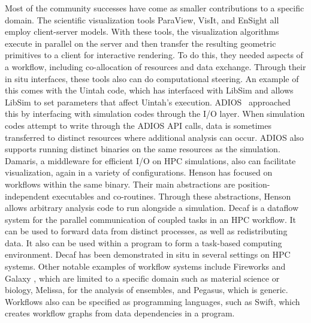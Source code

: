 \begin{refsection}
Most of the community successes have come as smaller contributions to a specific domain.
The scientific visualization tools ParaView, VisIt, and EnSight all employ client-server models.  With these tools, the visualization algorithms execute in parallel on the server and then transfer the resulting geometric primitives to a client for interactive rendering.  To do this, they needed aspects of a workflow, including co-allocation of resources and data exchange.  Through their in situ interfaces, these tools also can do computational steering.  An example of this comes with the Uintah code, which has interfaced with LibSim and allows LibSim to set parameters that affect Uintah’s execution.
ADIOS~\cite{Lofstead08} approached this by interfacing with simulation codes through the I/O layer.  When simulation codes attempt to write through the ADIOS API calls, data is sometimes transferred to distinct resources where additional analysis can occur.  ADIOS also supports running distinct binaries on the same resources as the simulation.  Damaris, a middleware for efficient I/O on HPC simulations, also can facilitate visualization, again in a variety of configurations.
Henson has focused on workflows within the same binary.  Their main abstractions are position-independent executables and co-routines.  Through these abstractions, Henson allows arbitrary analysis code to run alongside a simulation.
Decaf is a dataflow system for the parallel communication of coupled tasks in an HPC workflow.   It can be used to forward data from distinct processes, as well as redistributing data.  It also can be used within a program to form a task-based computing environment.  Decaf has been demonstrated in situ in several settings on HPC systems.  Other notable examples of workflow systems include Fireworks \cite{Jain15} and Galaxy \cite{Afgan11}, which are limited to a specific domain such as material science or biology, Melissa, for the analysis of ensembles, and Pegasus, which is generic.  Workflows also can be specified as programming languages, such as Swift, which creates workflow graphs from data dependencies in a program.


\end{refsection}
